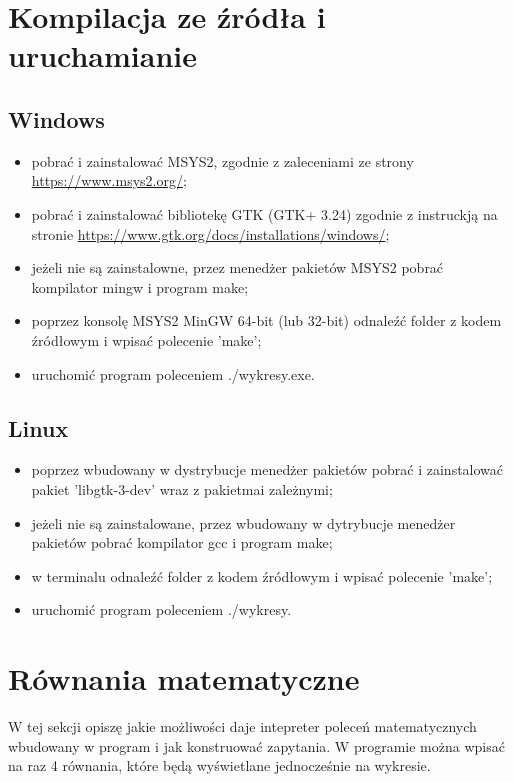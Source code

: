 \documentclass[a4paper]{article}
\begin{document}
\section{Kompilacja ze źródła i uruchamianie}

\subsection{Windows}
\begin{itemize}
    \item pobrać i zainstalować MSYS2, zgodnie z zaleceniami ze strony \url{https://www.msys2.org/};
    \item pobrać i zainstalować bibliotekę GTK (GTK+ 3.24) zgodnie z instruckją na stronie \url{https://www.gtk.org/docs/installations/windows/};
    \item jeżeli nie są zainstalowne, przez menedżer pakietów MSYS2 pobrać kompilator mingw i program make;
    \item poprzez konsolę MSYS2 MinGW 64-bit (lub 32-bit) odnaleźć folder z kodem źródłowym i wpisać polecenie 'make';
    \item uruchomić program poleceniem ./wykresy.exe.
\end{itemize}

\subsection{Linux}
\begin{itemize}
    \item poprzez wbudowany w dystrybucje menedżer pakietów pobrać i zainstalować pakiet 'libgtk-3-dev' wraz z pakietmai zależnymi;
    \item jeżeli nie są zainstalowane, przez wbudowany w dytrybucje menedżer pakietów pobrać kompilator gcc i program make;
    \item w terminalu odnaleźć folder z kodem źródłowym i wpisać polecenie 'make';
    \item uruchomić program poleceniem ./wykresy.
\end{itemize}

\section{Równania matematyczne}

W tej sekcji opiszę jakie możliwości daje intepreter poleceń matematycznych wbudowany w program i jak konstruować zapytania. W programie można wpisać na raz 4 równania, które będą wyświetlane jednocześnie na wykresie.
\end{document}
